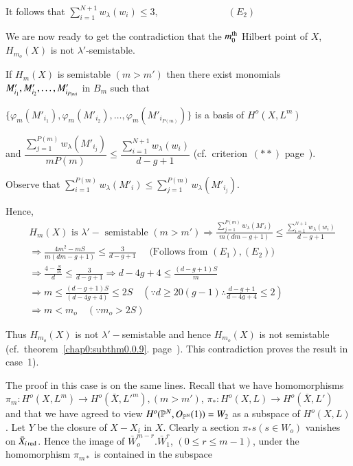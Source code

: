 {\noindent
It follows that $\sum\limits^{N+1}_{i=1} w_{\lambda}(w_{i}) \le
3, \hspace{3cm} (E_{2})$ 

We are now ready to get the contradiction that the $m^{\rm th}_{0}$
Hilbert point of $X$, $H_{m_{o}} (X)$ is not $\lambda'$-semistable. 

If $H_{m}(X)$ is semistable $(m > m')$ then there exist monomials
$M'_{i_{1}},\break M'_{i_{2}} , \ldots, M'_{i_{P(m)}}$ in $B_{m}$ such that  

\noindent
 $\{\varphi_{m} (M'_{i_{1}}), \varphi_{m} (M'_{i_{2}}), \ldots,
\varphi_{m}(M'_{i_{P(m)}})\}$ is a basis of $H^o (X , L^{m})$  
 
 \noindent
 and $\dfrac{\sum^{P(m)}_{j=1} w_{\lambda}(M'_{i_{j}})}{m P(m)} \le
 \dfrac{\sum^{N+1}_{i=1} w_{\lambda}(w_{i})}{d-g+1}$ (cf.\ 
criterion~$(**)$ page~\pageref{page10}).  

\noindent
Observe that $\sum\limits^{P(m)}_{i=1} w_{\lambda}(M'_{i}) \le
\sum\limits^{P(m)}_{j=1} w_{\lambda}(M'_{i_{j}})$. 

\noindent
Hence,
 \begin{align*}
& H_{m}(X) \text{ is } \lambda' - \text{ semistable } (m > m')
   \Rightarrow  \frac{\sum^{P(m)}_{j=1} w_{\lambda}(M'_{i})}{m
     (dm-g+1)} \le  \frac{\sum^{N+1}_{i=1}
     w_{\lambda}(w_{i})}{d-g+1}\\ 
& \Rightarrow \frac{4m^{2}-mS}{m(dm-g+1)} \le \frac{3}{d-g+1}
 \quad  \text{ (Follows from } (E_{1}), (E_{2}))\\ 
& \Rightarrow \frac{4-\frac{S}{m}}{d} \le \frac{3}{d-g+1} \Rightarrow
   d-4g+4 \le \frac{(d-g+1)S}{m}\\ 
& \Longrightarrow m \leq  \frac{(d-g+1)S}{(d-4g+4)}\leq 2S \quad (\because d
   \geq 20 (g-1) \therefore \frac{d-g+1}{d-4g+4} \le 2)\\ 
& \Longrightarrow m < m_o \quad (\because m_o > 2S)
\end{align*}\pageoriginale

Thus $H_{m_o}(X)$ is not $\lambda'-$semistable and hence $H_{m_o}(X)$
is not semista\-ble (cf.\ theorem~\ref{chap0:subthm0.0.9}. 
page~\pageref{chap0:subthm0.0.9}). This 
contradiction proves the result in case~1). 


\medskip
{}
The proof in this case is on the same lines. Recall that we have
homomorphisms $\pi_m : H^o (X, L^m) \to H^o (\bar{X}, L'^m), (m > m')$,
$\pi_* : H^o (X, L) \to H^o (\bar{X}, L')$ and that we have agreed to
view $H^o (\mathbb{P}^{N},\break O_{\mathbb{P^{N}}}(1)) = W_2$ as a subspace
of $H^o(X, L)$. Let $Y$ be the closure of $X-X_i$ in $X$. Clearly a
section $\pi_* s (s \in W_o)$ vanishes on
$\bar{X}_{i\operatorname{red}}$. Hence the image of $\bar{W}^{m-r}_o. \bar{W}^{r}_1$,
$(0 \le r \le m-1)$, under the homomorphism $\pi_{m*}$ is contained in
the subspace

}
